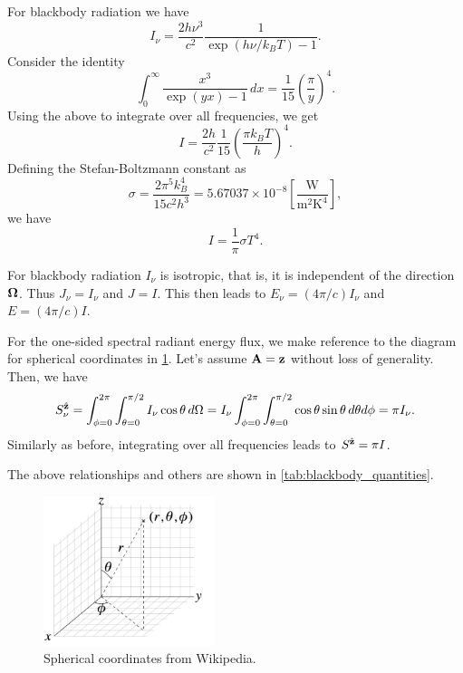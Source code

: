 \documentclass[a4paper,11pt]{article}
\begin{document}
For blackbody radiation we have
\begin{equation}
    I_\nu = \frac{2h\nu^3}{c^2} \frac{1}{\exp(h\nu/k_BT) - 1}.
\end{equation}
Consider the identity 
\begin{equation}
    \int_0^\infty \frac{x^3}{\exp(yx) - 1} \, dx = \frac{1}{15} \left ( \frac{\pi}{y} \right )^4.
\end{equation}
Using the above to integrate over all frequencies, we get
\begin{equation}
    I = \frac{2h}{c^2} \frac{1}{15} \left ( \frac{ \pi k_BT}{h} \right )^4.
\end{equation}
Defining the Stefan-Boltzmann constant as
\begin{equation}
    \sigma = \frac{2 \pi^5 k_B^4}{15 c^2 h^3} = 5.67037 \times 10^{-8} \left [ \frac{\text{W}}{\text{m}^2 \text{K}^4} \right ],
\end{equation}
we have
\begin{equation}
    I = \frac{1}{\pi} \sigma T^4.
\end{equation}

For blackbody radiation $I_\nu$ is isotropic, that is, it is independent of the direction $\bm \Omega$. Thus $J_\nu = I_\nu$ and $J = I$. This then leads to $E_\nu = (4\pi/c) I_\nu$ and  $E = (4\pi/c) I$.
    
For the one-sided spectral radiant energy flux, we make reference to the diagram for spherical coordinates in \cref{fig:spherical_coordinates}. Let's assume $\mathbf{A} = \mathbf{z}$ without loss of generality. Then, we have
\begin{equation}
    S_\nu^{\hat{\mathbf{z}}} = \int_{\phi = 0}^{2\pi} \int_{\theta=0}^{\pi/2} I_\nu \cos \theta \, d\Omega = I_\nu \int_{\phi = 0}^{2\pi} \int_{\theta=0}^{\pi/2} \cos \theta \sin \theta \, d\theta d\phi = \pi I_\nu.
\end{equation}
Similarly as before, integrating over all frequencies leads to $S^{\hat{\mathbf{z}}} = \pi I$.
    
The above relationships and others are shown in \cref{tab:blackbody_quantities}. 

\begin{figure}[ht]
    \centering
    \includegraphics[width=5cm]{../../images/spherical_coords_wiki.png}
    \caption{Spherical coordinates from Wikipedia.}
    \label{fig:spherical_coordinates}
\end{figure}
\end{document}

